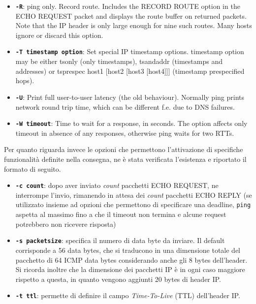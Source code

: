 \documentclass[a4paper,10pt]{article}
\begin{document}
\begin{itemize}
\item \textbf{\texttt{-R}}: ping only. Record route. Includes the RECORD ROUTE option in the ECHO REQUEST packet and displays the route buffer on returned packets. Note that the IP header is only large enough for nine such routes. Many hosts ignore or discard this option.

\item \textbf{\texttt{-T timestamp option}}: Set special IP timestamp options.  timestamp option may be either tsonly (only timestamps), tsandaddr (timestamps and addresses) or tsprespec host1 [host2 [host3 [host4]]] (timestamp prespecified hops).

\item \textbf{\texttt{-U}}:  Print full user-to-user latency (the old behaviour). Normally ping prints network round trip time, which can be different f.e. due to DNS failures.

\item \textbf{\texttt{-W timeout}}: Time to wait for a response, in seconds. The option affects only timeout in absence of any responses, otherwise ping waits for two RTTs.
\end{itemize}
Per quanto riguarda invece le opzioni che permettono l'attivazione di specifiche funzionalità definite nella consegna, ne è stata verificata l'esistenza e riportato il formato di seguito.
\begin{itemize}

\item \textbf{\texttt{-c count}}: dopo aver inviato \textit{count} pacchetti ECHO REQUEST, ne interrompe l'invio, rimanendo in attesa dei \textit{count} pacchetti ECHO REPLY (se utilizzato insieme ad opzioni che permettono di specificare una deadline, \texttt{ping} aspetta al massimo fino a che il timeout non termina e alcune request potrebbero non ricevere risposta) 

\item \textbf{\texttt{-s packetsize}}: specifica il numero di data byte da inviare. Il default corrisponde a 56 data bytes, che si traducono in una dimensione totale del pacchetto di 64 ICMP data bytes considerando anche gli 8 bytes dell'header. Si ricorda inoltre che la dimensione dei pacchetti IP è in ogni caso maggiore rispetto a questa, in quanto vengono aggiunti 20 bytes di header IP.

\item \textbf{\texttt{-t ttl}}: permette di definire il campo \textit{Time-To-Live} (TTL) dell'header IP. 

\end{itemize}
\end{document}
